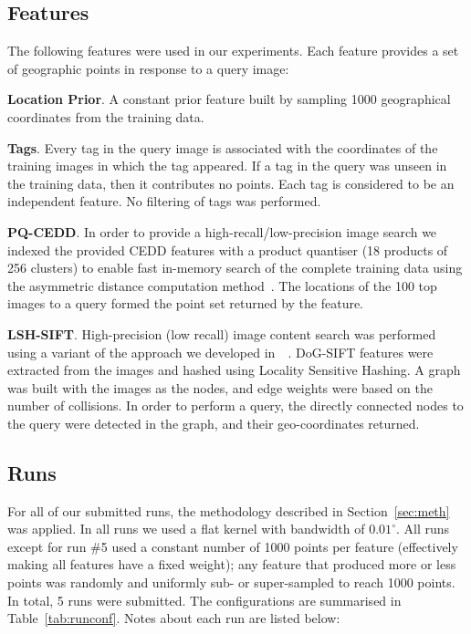 \documentclass{../acm_proc_article-me11_tweaked}
\begin{document}
\subsection{Features}
The following features were used in our experiments. Each feature provides a set of geographic points in response to a query image:

\noindent\textbf{Location Prior}. A constant prior feature built by sampling 1000 geographical coordinates from the training data.

\noindent\textbf{Tags}. Every tag in the query image is associated with the coordinates of the training images in which the tag appeared. If a tag in the query was unseen in the training data, then it contributes no points. Each tag is considered to be an independent feature. No filtering of tags was performed.

\noindent\textbf{PQ-CEDD}. In order to provide a high-recall/low-precision image search we indexed the provided CEDD features with a product quantiser (18 products of 256 clusters) to enable fast in-memory search of the complete training data using the asymmetric distance computation method~\cite{Jegou:2011:PQN:1916487.1916695}. The locations of the 100 top images to a query formed the point set returned by the feature.

\noindent\textbf{LSH-SIFT}. High-precision (low recall) image content search was performed using a variant of the approach we developed in~~\cite{Hare:2013:TVP:2461466.2461514}. DoG-SIFT features were extracted from the images and hashed using Locality Sensitive Hashing. A graph was built with the images as the nodes, and edge weights were based on the number of collisions. In order to perform a query, the directly connected nodes to the query were detected in the graph, and their geo-coordinates returned.

\subsection{Runs}
For all of our submitted runs, the methodology described in Section~\ref{sec:meth} was applied. In all runs we used a flat kernel with bandwidth of $0.01^\circ$. All runs except for run \#5 used a constant number of 1000 points per feature (effectively making all features have a fixed weight); any feature that produced more or less points was randomly and uniformly sub- or super-sampled to reach 1000 points. In total, 5 runs were submitted. The configurations are summarised in Table~\ref{tab:runconf}. Notes about each run are listed below:
\end{document}

